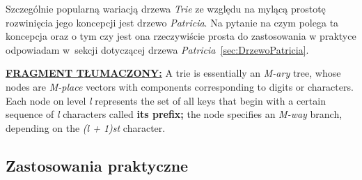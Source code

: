     	Szczególnie popularną wariacją drzewa \emph{Trie} ze względu na mylącą prostotę rozwinięcia jego koncepcji jest drzewo \emph{Patricia}. Na pytanie na czym polega ta koncepcja oraz o tym czy jest ona rzeczywiście prosta do zastosowania w praktyce odpowiadam w~sekcji dotyczącej drzewa \emph{Patricia}~\ref{sec:DrzewoPatricia}.
		
	\ifsourcematerial
		\begin{displayquote}
			\color{ao(english)}
			\underline{\textbf{FRAGMENT TŁUMACZONY:}} \newline
			A trie \elide is essentially an \emph{M-ary} tree, whose nodes are \emph{M-place} vectors with components corresponding to digits or characters. Each node on level \emph{l} represents the set of all keys that begin with a certain sequence of \emph{l} characters called \textbf{its prefix;} the node specifies an \emph{M-way} branch, depending on the \emph{(l + 1)st} character.
		\end{displayquote}
	\fi
	
        \subsection{Zastosowania praktyczne}\label{sec:ZastosowaniaPraktyczne}
        
